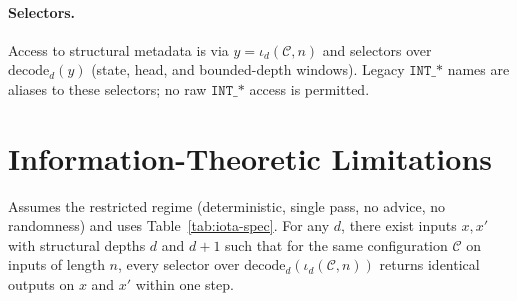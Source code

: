 \paragraph{Selectors.} Access to structural metadata is via $y=\iota_d(\mathcal{C},n)$ and selectors over $\mathrm{decode}_d(y)$ (state, head, and bounded-depth windows). Legacy $\texttt{INT\_*}$ names are aliases to these selectors; no raw $\texttt{INT\_*}$ access is permitted.

\section{Information-Theoretic Limitations}

\begin{lemma}
Assumes the restricted regime (deterministic, single pass, no advice, no randomness) and uses Table~\ref{tab:iota-spec}.
For any $d$, there exist inputs $x,x'$ with structural depths $d$ and $d{+}1$ such that for the same configuration $\mathcal{C}$ on inputs of length $n$, every selector over $\mathrm{decode}_d(\iota_d(\mathcal{C},n))$ returns identical outputs on $x$ and $x'$ within one step.
\end{lemma}

